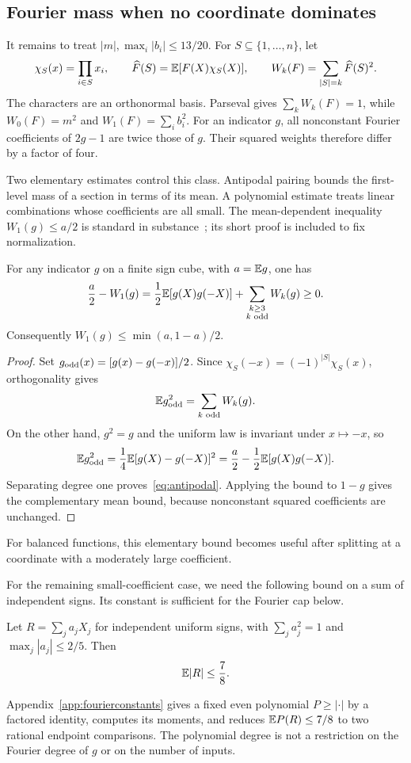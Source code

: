 \subsection{Fourier mass when no coordinate dominates}\label{sec:geometric}
It remains to treat $|m|,\max_i|b_i|\le13/20$. For $S\subseteq\{1,\ldots,n\}$, let
\[
\chi_S(x)=\prod_{i\in S}x_i,\qquad
\widehat F(S)=\mathbb E[F(X)\chi_S(X)],\qquad
W_k(F)=\sum_{|S|=k}\widehat F(S)^2.
\]
The characters are an orthonormal basis. Parseval gives $\sum_kW_k(F)=1$, while $W_0(F)=m^2$ and $W_1(F)=\sum_i b_i^2$. For an indicator $g$, all nonconstant Fourier coefficients of $2g-1$ are twice those of $g$. Their squared weights therefore differ by a factor of four.

Two elementary estimates control this class. Antipodal pairing bounds the first-level mass of a section in terms of its mean. A polynomial estimate treats linear combinations whose coefficients are all small. The mean-dependent inequality $W_1(g)\le a/2$ is standard in substance~\cite{YT,FWY}; its short proof is included to fix normalization.

\begin{lemma}\label{lem:antipodal}
For any indicator $g$ on a finite sign cube, with $a=\mathbb E g$, one has
\begin{equation}\label{eq:antipodal}
\frac a2-W_1(g)
=\frac12\mathbb E[g(X)g(-X)]+\sum_{\substack{k\ge3\\ k\text{ odd}}}W_k(g)\ge0.
\end{equation}
Consequently $W_1(g)\le\min(a,1-a)/2$.
\end{lemma}
\begin{proof}
Set $g_{\rm odd}(x)=[g(x)-g(-x)]/2$. Since $\chi_S(-x)=(-1)^{|S|}\chi_S(x)$, orthogonality gives
\[
\mathbb E g_{\rm odd}^2=\sum_{k\text{ odd}}W_k(g).
\]
On the other hand, $g^2=g$ and the uniform law is invariant under $x\mapsto-x$, so
\[
\mathbb E g_{\rm odd}^2=\frac14\mathbb E[g(X)-g(-X)]^2
=\frac a2-\frac12\mathbb E[g(X)g(-X)].
\]
Separating degree one proves~\eqref{eq:antipodal}. Applying the bound to $1-g$ gives the complementary mean bound, because nonconstant squared coefficients are unchanged.
\end{proof}
For balanced functions, this elementary bound becomes useful after splitting at a coordinate with a moderately large coefficient.

For the remaining small-coefficient case, we need the following bound on a sum of independent signs. Its constant is sufficient for the Fourier cap below.
\begin{lemma}\label{lem:rademacher}
Let $R=\sum_j a_jX_j$ for independent uniform signs, with $\sum_j a_j^2=1$ and $\max_j|a_j|\le2/5$. Then
\begin{equation}\label{eq:cappedR}
\mathbb E|R|\le\frac78.
\end{equation}
\end{lemma}
Appendix~\ref{app:fourierconstants} gives a fixed even polynomial $P\ge|\cdot|$ by a factored identity, computes its moments, and reduces $\mathbb E P(R)\le7/8$ to two rational endpoint comparisons. The polynomial degree is not a restriction on the Fourier degree of $g$ or on the number of inputs.


